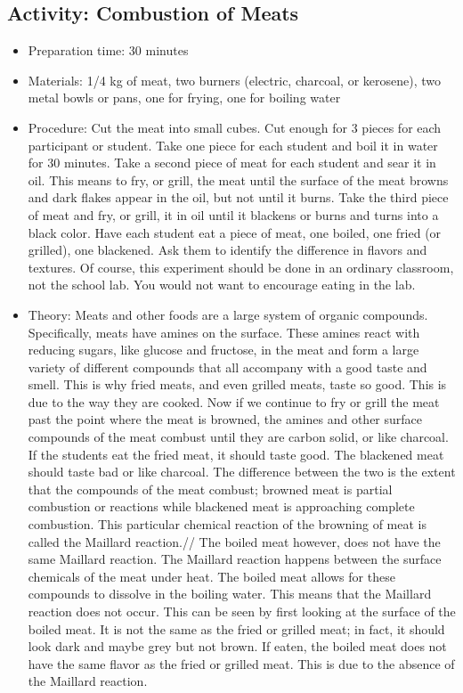 \begin{itemize}
{\subsection{Activity: Combustion of Meats}
\begin{itemize}
\item{Preparation time: 30 minutes}
\item{Materials: 1/4 kg of meat, two burners (electric, charcoal, or kerosene), two metal bowls or pans, one for frying, one for boiling water}
\item{Procedure: Cut the meat into small cubes. Cut enough for 3 pieces for each participant or student. Take one piece for each student and boil it in water for 30 minutes. Take a second piece of meat for each student and sear it in oil. This means to fry, or grill, the meat until the surface of the meat browns and dark flakes appear in the oil, but not until it burns. Take the third piece of meat and fry, or grill, it in oil until it blackens or burns and turns into a black color. Have each student eat a piece of meat, one boiled, one fried (or grilled), one blackened. Ask them to identify the difference in flavors and textures. Of course, this experiment should be done in an ordinary classroom, not the school lab. You would not want to encourage eating in the lab. }
\item{Theory: Meats and other foods are a large system of organic compounds. Specifically, meats have amines on the surface. These amines react with reducing sugars, like glucose and fructose, in the meat and form a large variety of different compounds that all accompany with a good taste and smell. This is why fried meats, and even grilled meats, taste so good. This is due to the way they are cooked. Now if we continue to fry or grill the meat past the point where the meat is browned, the amines and other surface compounds of the meat combust until they are carbon solid, or like charcoal. If the students eat the fried meat, it should taste good. The blackened meat should taste bad or like charcoal. The difference between the two is the extent that the compounds of the meat combust; browned meat is partial combustion or reactions while blackened meat is approaching complete combustion. This particular chemical reaction of the browning of meat is called the Maillard reaction.//
The boiled meat however, does not have the same Maillard reaction. The Maillard reaction happens between the surface chemicals of the meat under heat. The boiled meat allows for these compounds to dissolve in the boiling water. This means that the Maillard reaction does not occur. This can be seen by first looking at the surface of the boiled meat. It is not the same as the fried or grilled meat; in fact, it should look dark and maybe grey but not brown. If eaten, the boiled meat does not have the same flavor as the fried or grilled meat. This is due to the absence of the Maillard reaction.}


\end{itemize}}
\end{itemize}
